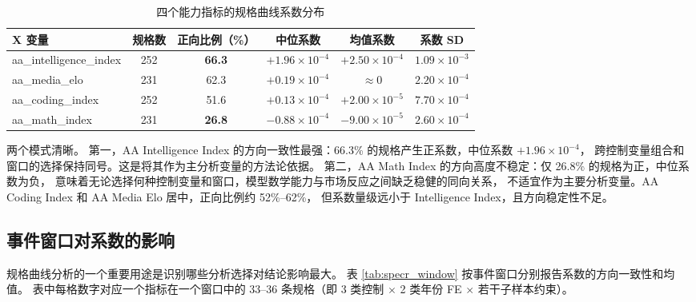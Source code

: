 \documentclass[11pt,fontset=fandol,a4paper]{ctexart}
\begin{document}
\begin{table}[htbp]
\centering
\caption{四个能力指标的规格曲线系数分布}
\label{tab:specr_main}
\small
\begin{tabular}{lccccc}
\toprule
X 变量 & 规格数 & 正向比例（\%） & 中位系数 & 均值系数 & 系数 SD \\
\midrule
aa\_intelligence\_index & 252 & \textbf{66.3} & $+1.96\times10^{-4}$ & $+2.50\times10^{-4}$ & $1.09\times10^{-3}$ \\
aa\_media\_elo          & 231 & 62.3           & $+0.19\times10^{-4}$ & $\approx0$              & $2.20\times10^{-4}$ \\
aa\_coding\_index       & 252 & 51.6           & $+0.13\times10^{-4}$ & $+2.00\times10^{-5}$ & $7.70\times10^{-4}$ \\
aa\_math\_index         & 231 & \textbf{26.8} & $-0.88\times10^{-4}$ & $-9.00\times10^{-5}$ & $2.60\times10^{-4}$ \\
\bottomrule
\end{tabular}
\end{table}

两个模式清晰。
第一，AA Intelligence Index 的方向一致性最强：66.3\% 的规格产生正系数，中位系数 $+1.96\times10^{-4}$，
跨控制变量组合和窗口的选择保持同号。这是将其作为主分析变量的方法论依据。
第二，AA Math Index 的方向高度不稳定：仅 26.8\% 的规格为正，中位系数为负，
意味着无论选择何种控制变量和窗口，模型数学能力与市场反应之间缺乏稳健的同向关系，
不适宜作为主要分析变量。AA Coding Index 和 AA Media Elo 居中，正向比例约 52\%--62\%，
但系数量级远小于 Intelligence Index，且方向稳定性不足。

\subsection{事件窗口对系数的影响}

规格曲线分析的一个重要用途是识别哪些分析选择对结论影响最大。
表 \ref{tab:specr_window} 按事件窗口分别报告系数的方向一致性和均值。
表中每格数字对应一个指标在一个窗口中的 33--36 条规格（即 3 类控制 $\times$ 2 类年份 FE $\times$ 若干子样本约束）。
\end{document}
